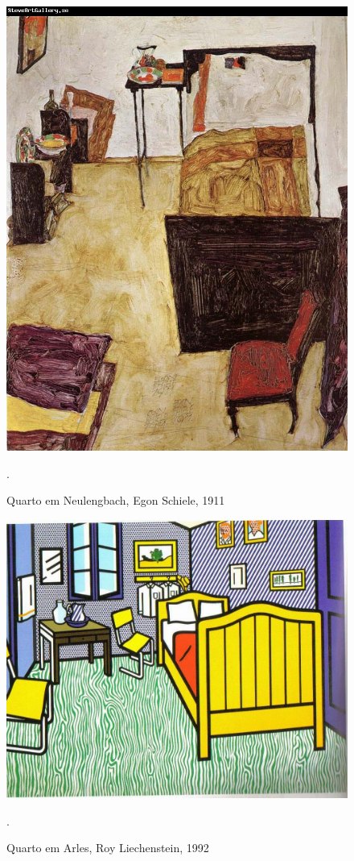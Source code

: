 \documentclass{article}
\begin{document}
\begin{figure}
\centering\includegraphics[height=0.3\textheight,keepaspectratio]
                          {schiele.jpg}
  \caption{Quarto em Neulengbach, Egon Schiele, 1911}.
  \label{fig:6}
\end{figure}

\begin{figure}
\centering\includegraphics[height=0.3\textheight,keepaspectratio]
                          {liechenstein.jpg}
  \caption{Quarto em Arles, Roy Liechenstein, 1992}.
  \label{fig:7}
\end{figure}

\printbibliography[heading=bibliography,title={Bibliografia}]
\end{document}
